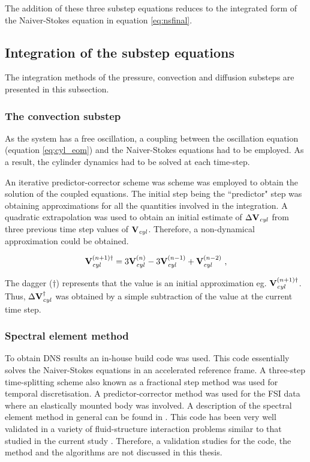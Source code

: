 The addition of these three substep equations reduces to the integrated form of the Naiver-Stokes equation in equation \ref{eq:nsfinal}. 

\subsection{Integration of the substep equations}
\label{subsec:sol}
 
 The integration methods of the pressure, convection and diffusion substeps are presented in this subsection. 
 
 \subsubsection{The convection substep}
 \label{subsub:convec}
 
As the system has a free oscillation, a coupling between the oscillation equation (equation \ref{eq:cyl_eom}) and the Naiver-Stokes equations had to be employed. As a result, the cylinder dynamics had to be solved at each time-step.

An iterative predictor-corrector scheme was scheme was employed to obtain the solution of the coupled equations. The initial step being the ``predictor" step was obtaining approximations for all the quantities involved in  the integration. A quadratic extrapolation was used to obtain an initial estimate of $\Delta\mathbf{V}_{\mathit{cyl}}$ from  three previous time step values of $\mathbf{V}_{\mathit{cyl}}$. Therefore, a non-dynamical approximation could be obtained.  
 
 
\begin{equation} \centering
\label{eq:vcyl_start}
\Vcyl^{(n+1)\dag} = 3\Vcyl^{(n)} - 3\Vcyl^{(n-1)} + \Vcyl^{(n-2)} ~,
\end{equation}


The dagger ($\dag$) represents that the value is an initial approximation eg. $\mathbf{V}_{\mathit{cyl}}^{(n+1)\dag}$. Thus, $\Delta\mathbf{V}_{\mathit{cyl}}^{\dag}$ was obtained by a simple subtraction of the value at the current time step. 





 




\subsubsection{Spectral element method}

To obtain DNS results an in-house build code was used. This code essentially solves the Naiver-Stokes equations in an accelerated reference frame. A three-step time-splitting scheme also known as a fractional step method was used for temporal discretisation. A predictor-corrector method was used for the FSI data where an elastically mounted body was involved. A description of the spectral element method in general can be found in \citet{karniadakis2005}. This code has been very well validated in a variety of fluid-structure interaction problems similar to that studied in the current study \citep{Leontini2007a,Griffith2011,Leontini2011,Leontini2013}. Therefore, a validation studies for the code, the method and the algorithms are not discussed in this thesis. 
   


